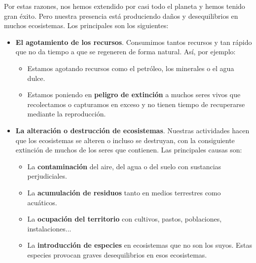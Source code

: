 \vspace{3mm}
Por estas razones, nos hemos extendido por casi todo el planeta y hemos tenido gran éxito. Pero nuestra presencia está produciendo daños y desequilibrios en muchos ecosistemas. Los principales son los siguientes:
\begin{itemize}
    \item \textbf{El agotamiento de los recursos}. Consumimos tantos recursos y tan rápido que no da tiempo a que se regeneren de forma natural. Así, por ejemplo:
    \begin{itemize}
        \item Estamos agotando recursos como el petróleo, los minerales o el agua dulce.
        \item Estamos poniendo en \textbf{peligro de extinción} a muchos seres vivos que recolectamos o capturamos en exceso y no tienen tiempo de recuperarse mediante la reproducción.
    \end{itemize}
    \item \textbf{La alteración o destrucción de ecosistemas}. Nuestras actividades hacen que los ecosistemas se alteren o incluso se destruyan, con la consiguiente extinción de muchos de los seres que contienen. Las principales causas son:
    \begin{itemize}
        \item La \textbf{contaminación} del aire, del agua o del suelo con sustancias perjudiciales.
        \item La \textbf{acumulación de residuos} tanto en medios terrestres como acuáticos.
        \item La \textbf{ocupación del territorio} con cultivos, pastos, poblaciones, instalaciones...
        \item La \textbf{introducción de especies} en ecosistemas que no son los suyos. Estas especies provocan graves desequilibrios en esos ecosistemas.
    \end{itemize}
\end{itemize}